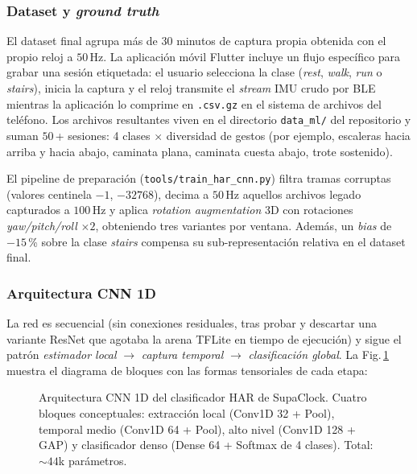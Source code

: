\documentclass[letterpaper,11pt]{article}
\newcommand{\rfigura}[1]{Fig.\,\ref{#1}}
\newcommand{\NombreProyecto}{SupaClock}
\begin{document}
\subsubsection*{Dataset y \textit{ground truth}}
El dataset final agrupa m\'as de $30$ minutos de captura propia obtenida con el propio reloj a $50$\,Hz. La aplicaci\'on m\'ovil Flutter incluye un flujo espec\'ifico para grabar una sesi\'on etiquetada: el usuario selecciona la clase (\textit{rest}, \textit{walk}, \textit{run} o \textit{stairs}), inicia la captura y el reloj transmite el \textit{stream} IMU crudo por BLE mientras la aplicaci\'on lo comprime en \texttt{.csv.gz} en el sistema de archivos del tel\'efono. Los archivos resultantes viven en el directorio \texttt{data\_ml/} del repositorio y suman $50$\,+ sesiones: 4 clases $\times$ diversidad de gestos (por ejemplo, escaleras hacia arriba y hacia abajo, caminata plana, caminata cuesta abajo, trote sostenido).

El pipeline de preparaci\'on (\texttt{tools/train\_har\_cnn.py}) filtra tramas corruptas (valores centinela $-1$, $-32768$), decima a $50$\,Hz aquellos archivos legado capturados a $100$\,Hz y aplica \textit{rotation augmentation} 3D con rotaciones \textit{yaw/pitch/roll} $\times 2$, obteniendo tres variantes por ventana. Adem\'as, un \textit{bias} de $-15$\,\% sobre la clase \textit{stairs} compensa su sub-representaci\'on relativa en el dataset final.

\subsubsection*{Arquitectura CNN 1D}
La red es secuencial (sin conexiones residuales, tras probar y descartar una variante ResNet que agotaba la arena TFLite en tiempo de ejecuci\'on) y sigue el patr\'on \textit{estimador local} $\to$ \textit{captura temporal} $\to$ \textit{clasificaci\'on global}. La \rfigura{fig:har_arch} muestra el diagrama de bloques con las formas tensoriales de cada etapa:

\begin{figure}[H]
    \centering
    \resizebox{0.98\textwidth}{!}{}
    \caption[Arquitectura CNN 1D HAR]{Arquitectura CNN 1D del clasificador HAR de \NombreProyecto. Cuatro bloques conceptuales: extracci\'on local (Conv1D 32 + Pool), temporal medio (Conv1D 64 + Pool), alto nivel (Conv1D 128 + GAP) y clasificador denso (Dense 64 + Softmax de 4 clases). Total: $\sim 44$k par\'ametros.}
    \label{fig:har_arch}
\end{figure}
\end{document}
